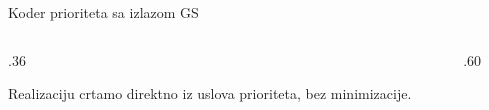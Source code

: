 \begin{frame}[label=03-s017]{Koder prioriteta sa izlazom GS}
\begin{columns}[T,onlytextwidth]
\begin{column}{.36\textwidth}
{\centering{}}
\vspace{2mm}

\par\vspace{2mm}
Realizaciju crtamo direktno iz uslova prioriteta, bez minimizacije.
\end{column}
\begin{column}{.60\textwidth}\centering
\begingroup
\def\DEenable{0}\def\DEjedinica{.9cm}\def\DEgejt{.65}

\endgroup
\end{column}
\end{columns}
\end{frame}
